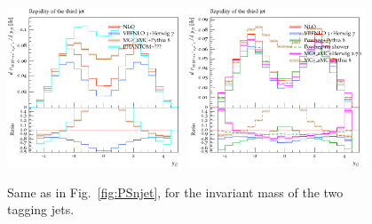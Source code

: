 \begin{figure}[hbt]
\centering
\includegraphics[width=0.47\textwidth]{figures/LOPS/y_j3.pdf}
\includegraphics[width=0.47\textwidth]{figures/NLOPS/y_j3.pdf}
\caption{Same as in Fig.~\protect\ref{fig:PSnjet}, for the invariant mass of the two tagging jets.}
\label{fig:PSy3}
\end{figure}
